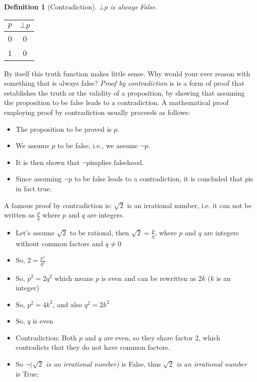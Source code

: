 \documentclass[10pt,a4paper,draft,titlepage,onecolumn]{book}
\newtheorem{definition}{Definition}[section]
\begin{document}
\begin{definition}[Contradiction] $\bot p$ is always False.
\end{definition}  
\begin{center}
\begin{tabular}{ |c|c| }
 \hline
 $p$ &  ${\bot}p $ \\
 \hline
 0 &  0 \\
 1 &  0\\
 \hline
\end{tabular}
\end{center}
By itself this truth function makes little sense. Why would your ever reason with something that is always false?
\textit{Proof by contradiction } is  is a form of proof that establishes the truth or the validity of a proposition, by showing that assuming the proposition to be false leads to a contradiction. 
A mathematical proof employing proof by contradiction usually proceeds as follows:
\begin{itemize}
\item The proposition to be proved is $p$.
\item We assume $p$ to be false, i.e., we assume $\neg p$.
\item It is then shown that $\neg p$implies falsehood. 
\item Since assuming $\neg p$ to be false leads to a contradiction, it is concluded that $ p$is in fact true.
\end{itemize}
A famous proof by contradiction is: $\sqrt{2}$ is an irrational number, i.e. it can not be written as  $\frac{p}{q}$ where $p$ and $q$ are integers.
\begin{itemize}
\item Let's assume $\sqrt{2}$  to  be rational, then $\sqrt{2} = \frac{p}{q}$, where $p$ and $q$ are integers without common factors and $q \neq 0$
\item So, $ 2 = \frac{p^2}{q^2} $   
\item So, $ p^2 = 2{q^2} $ which means $p$ is even and can be rewritten as $ 2k$ ($k$ is an integer)
\item So,  $ p^2 = 4k^2$, and also $ q^2 = 2k^2$
\item So, $q$ is even
\item Contradiction: Both $p$ and $q$ are even, so they share factor 2, which contradicts that they do not have common factors.  
\item So  \textit{${\neg}(\sqrt{2}$ is an irrational number)} is False, thus  \textit{$\sqrt{2}$ is an irrational number }is True; 
\end{itemize}
\end{document}
